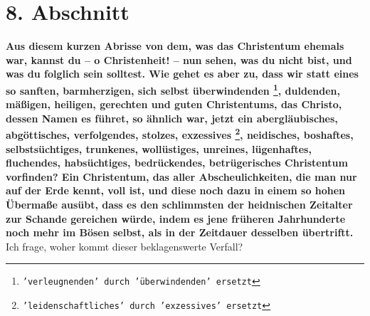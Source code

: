\section{8. Abschnitt}  \label{kap2_ab8}

\label{ref:02_08_schlimmer_als_heiden}
\textbf{Aus diesem kurzen Abrisse von dem, was das Christentum ehemals war,
kannst
du -- o Christenheit! -- nun sehen, was du nicht bist, und was du folglich sein
solltest. Wie gehet es aber zu, dass wir statt eines so sanften, barmherzigen,
sich selbst überwindenden
\footnote{\texttt{'verleugnenden' durch 'überwindenden' ersetzt}},
duldenden, mäßigen, heiligen, gerechten und guten Christentums, das Christo,
dessen Namen es führet, so ähnlich war, jetzt ein abergläubisches, abgöttisches,
verfolgendes, stolzes, exzessives
\footnote{\texttt{'leidenschaftliches' durch 'exzessives' ersetzt}},
neidisches, boshaftes, selbstsüchtiges,
trunkenes, wollüstiges, unreines, lügenhaftes, fluchendes, habsüchtiges,
bedrückendes, betrügerisches Christentum vorfinden? Ein Christentum, das aller
Abscheulichkeiten, die man nur auf der Erde kennt, voll ist, und diese noch dazu
in einem so hohen Übermaße ausübt, dass es den schlimmsten der heidnischen
Zeitalter zur Schande gereichen würde, indem es jene früheren Jahrhunderte noch
mehr im Bösen selbst, als in der Zeitdauer desselben übertriftt.} Ich frage,
woher kommt dieser beklagenswerte Verfall?

\medskip

